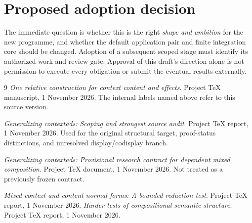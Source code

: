 \documentclass[11pt,a4paper]{article}
\begin{document}
\section*{Proposed adoption decision}

The immediate question is whether this is the right \emph{shape and ambition}
for the new programme, and whether the default application pair and finite
integration core should be changed. Adoption of a subsequent scoped stage
must identify its authorized work and review gate. Approval of this draft's
direction alone is not permission to execute every obligation or submit the
eventual results externally.

\begin{thebibliography}{9}
\emph{One relative construction for context content and effects}.
Project TeX manuscript, 1 November 2026.
The internal labels named above refer to this source version.

\emph{Generalizing contextads: Scoping and strongest source audit}.
Project TeX report, 1 November 2026.
Used for the original structural target, proof-status distinctions, and
unresolved display/codisplay branch.

\emph{Generalizing contextads: Provisional research contract for dependent
mixed composition}.
Project TeX document, 1 November 2026.
Not treated as a previously frozen contract.

\emph{Mixed context and content normal forms: A bounded reduction test}.
Project TeX report, 1 November 2026.
\emph{Harder tests of compositional semantic structure}.
Project TeX report, 1 November 2026.
\end{thebibliography}
\end{document}
